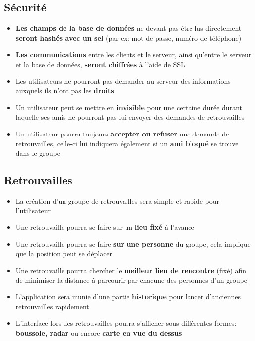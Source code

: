 \documentclass[french]{article}
\begin{document}
		\subsection{Sécurité}
			\begin{itemize}
				\item \textbf{Les champs de la base de données} ne devant pas être lus directement \textbf{seront hashés avec un sel} (par ex: mot de passe, numéro de téléphone)
				\item \textbf{Les communications} entre les clients et le serveur, ainsi qu'entre le serveur et la base de données, \textbf{seront chiffrées} à l'aide de SSL
				\item Les utilisateurs ne pourront pas demander au serveur des informations auxquels ils n'ont pas les \textbf{droits} 
				\item Un utilisateur peut se mettre en \textbf{invisible} pour une certaine durée durant laquelle ses amis ne pourront pas lui envoyer des demandes de retrouvailles
				\item Un utilisateur pourra toujours \textbf{accepter ou refuser} une demande de retrouvailles, celle-ci lui indiquera également si un \textbf{ami bloqué} se trouve dans le groupe
			\end{itemize}
		
		\subsection{Retrouvailles}
			\begin{itemize}
				\item La création d'un groupe de retrouvailles sera simple et rapide pour l'utilisateur
				\item Une retrouvaille pourra se faire sur un \textbf{lieu fixé} à l'avance 
				\item Une retrouvaille pourra se faire \textbf{sur une personne} du groupe, cela implique que la position peut se déplacer
				\item Une retrouvaille pourra chercher le \textbf{meilleur lieu de rencontre} (fixé) afin de minimiser la distance à parcourir par chacune des personnes d'un groupe
				\item L'application sera munie d'une partie \textbf{historique} pour lancer d'anciennes retrouvailles rapidement 
				\item L'interface lors des retrouvailles pourra s'afficher sous différentes formes: \textbf{boussole, radar} ou encore \textbf{carte en vue du dessus}
			\end{itemize}
			
\end{document}
